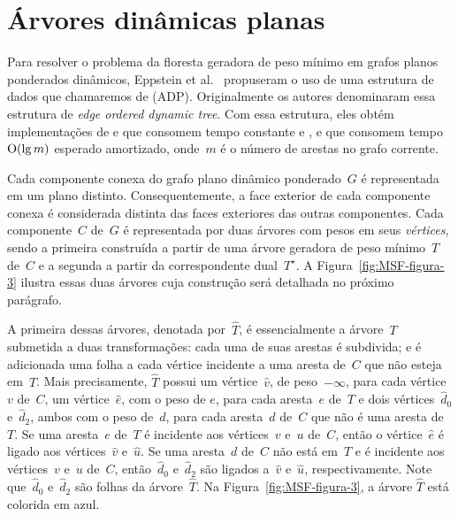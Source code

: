 \section{Árvores dinâmicas planas}
\label{sec:ADP}

Para resolver o problema da floresta geradora de peso mínimo em grafos planos ponderados dinâmicos, Eppstein et al.~\cite{EPPSTEIN-planar} propuseram o uso de uma estrutura de dados que chamaremos de  (ADP). Originalmente os autores denominaram essa estrutura de \textit{edge ordered dynamic tree}.
Com essa estrutura, eles obtém implementações de \MSFCreate{} e \MSFweight{} que consomem tempo constante e \MSFaddEdge{}, \MSFdelEdge{} e \MSFupdate{} que consomem tempo~$\mathrm{O}(\lg m)$ esperado amortizado, onde~$m$ é o número de arestas no grafo corrente. 



Cada componente conexa do grafo plano dinâmico ponderado~$G$ é representada em um plano distinto.
Consequentemente, a face exterior de cada componente conexa é considerada distinta das faces exteriores das outras componentes.
Cada componente~$C$ de~$G$ é representada por duas árvores com pesos em seus \textit{vértices}, sendo a primeira construída a partir de uma árvore geradora de peso mínimo~$T$ de~$C$ e a segunda a partir da correspondente dual~$T^\star$.
A Figura~\ref{fig:MSF-figura-3} ilustra essas duas árvores cuja construção será detalhada no próximo parágrafo.

A primeira dessas árvores, denotada por~$\hat T$, é essencialmente a árvore~$T$ submetida a duas transformações:
cada uma de suas arestas é subdivida; e é adicionada uma folha a cada vértice incidente a uma aresta de~$C$ que não esteja em~$T$.
Mais precisamente, $\hat T$ possui um vértice~$\hat v$, de peso~$-\infty$, para cada vértice~$v$ de~$C$, um vértice~$\hat e$, com o peso de $e$, para cada aresta~$e$ de~$T$ e dois vértices~$\hat d_0$ e~$\hat d_2$, ambos com o peso de~$d$, para cada aresta~$d$ de~$C$ que não é uma aresta de~$T$.
Se uma aresta~$e$ de~$T$ é incidente aos vértices~$v$ e~$u$ de~$C$, então o vértice~$\hat e$ é ligado aos vértices~$\hat v$ e~$\hat u$.
Se uma aresta~$d$ de~$C$ não está em~$T$ e é incidente aos vértices~$v$ e~$u$ de~$C$, então~$\hat d_0$ e~$\hat d_2$ são ligados a~$\hat v$ e~$\hat u$, respectivamente.
Note que~$\hat d_0$ e~$\hat d_2$ são folhas da árvore~$\hat T$.
Na Figura~\ref{fig:MSF-figura-3}, a árvore $\hat T$ está colorida em azul.

